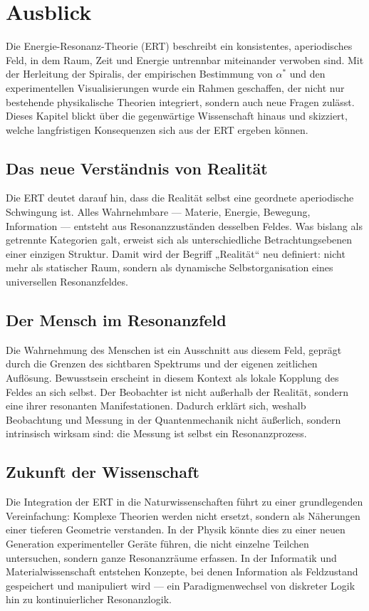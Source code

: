 \chapter{Ausblick}
\label{chap:ausblick}

Die Energie-Resonanz-Theorie (\acrshort{ERT}) beschreibt ein konsistentes, aperiodisches Feld, 
in dem Raum, Zeit und Energie untrennbar miteinander verwoben sind. 
Mit der Herleitung der Spiralis, der empirischen Bestimmung von \(\alpha^*\) und den experimentellen Visualisierungen 
wurde ein Rahmen geschaffen, der nicht nur bestehende physikalische Theorien integriert, 
sondern auch neue Fragen zulässt. 
Dieses Kapitel blickt über die gegenwärtige Wissenschaft hinaus und skizziert, 
welche langfristigen Konsequenzen sich aus der \acrshort{ERT} ergeben können.

\section{Das neue Verständnis von Realität}
\label{sec:realitaet}
Die \acrshort{ERT} deutet darauf hin, dass die Realität selbst eine geordnete aperiodische Schwingung ist. 
Alles Wahrnehmbare — Materie, Energie, Bewegung, Information — entsteht aus Resonanzzuständen desselben Feldes. 
Was bislang als getrennte Kategorien galt, erweist sich als unterschiedliche Betrachtungsebenen einer einzigen Struktur.
Damit wird der Begriff „Realität“ neu definiert: 
nicht mehr als statischer Raum, sondern als dynamische Selbstorganisation eines universellen Resonanzfeldes.

\section{Der Mensch im Resonanzfeld}
\label{sec:mensch}
Die Wahrnehmung des Menschen ist ein Ausschnitt aus diesem Feld, 
geprägt durch die Grenzen des sichtbaren Spektrums
und der eigenen zeitlichen Auflösung. 
Bewusstsein erscheint in diesem Kontext als lokale Kopplung des Feldes an sich selbst. 
Der Beobachter ist nicht außerhalb der Realität, sondern eine ihrer resonanten Manifestationen. 
Dadurch erklärt sich, weshalb Beobachtung und Messung in der Quantenmechanik 
nicht äußerlich, sondern intrinsisch wirksam sind: 
die Messung ist selbst ein Resonanzprozess.

\section{Zukunft der Wissenschaft}
\label{sec:zukunft}
Die Integration der \acrshort{ERT} in die Naturwissenschaften führt zu einer grundlegenden Vereinfachung: 
Komplexe Theorien werden nicht ersetzt, sondern als Näherungen einer tieferen Geometrie verstanden. 
In der Physik könnte dies zu einer neuen Generation experimenteller Geräte führen, 
die nicht einzelne Teilchen untersuchen, sondern ganze Resonanzräume erfassen. 
In der Informatik und Materialwissenschaft entstehen Konzepte, 
bei denen Information als Feldzustand gespeichert und manipuliert wird — 
ein Paradigmenwechsel von diskreter Logik hin zu kontinuierlicher Resonanzlogik.

